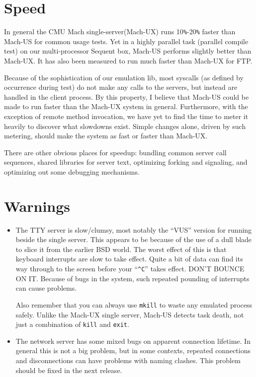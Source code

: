 \section{Speed}
In general the CMU Mach single-server(Mach-UX) runs 10\verb|%|-20\verb|%|
faster than Mach-US for common usage tests.
Yet in a highly parallel task (parallel compile test) on our 
multi-processor Sequent box,
Mach-US performs slightly better than Mach-UX.
It has also been measured to run much faster than Mach-UX for FTP.

Because of the sophistication of our emulation lib,
most syscalls (as defined by
occurrence during test) do not make any calls to the servers, but instead
are handled in the client process.
By this property,  I believe that Mach-US could be
made to run faster than the Mach-UX system in general.
Furthermore, with the exception of remote method invocation,
we have yet to find the time to
meter it heavily to discover what slowdowns exist.
Simple changes alone, driven by such metering, should make the system as fast
or faster than Mach-UX.

There are other obvious places for speedup:  bundling common server call
sequences, shared libraries for server text,
optimizing forking and signaling, and optimizing out some
debugging mechanisms.

\section{Warnings}
\begin{itemize}
\item
The TTY server is slow/clumsy, most notably the ``VUS'' version for
running beside the single server.  This appears to be because of the
use of a dull blade to slice it from the earlier BSD world.  The worst
effect of this is that keyboard interrupts are slow to take effect.
Quite a bit of data can find its way through to the screen before
your ``\verb|^C|'' takes effect.  DON'T BOUNCE ON IT.  Because of bugs in the
system, such repeated pounding of interrupts can cause problems.

Also remember that you can always use \verb|mkill|
to waste any emulated process
safely.  Unlike the Mach-UX single server, Mach-US detects task death,
not just a combination of \verb|kill| and \verb|exit|.

\item
The network server has some mixed bugs on apparent connection lifetime.
In general this is not a big problem, but in some contexts, repeated
connections and disconnections can have problems with naming clashes.
This problem should be fixed in the next release.
\end{itemize}

